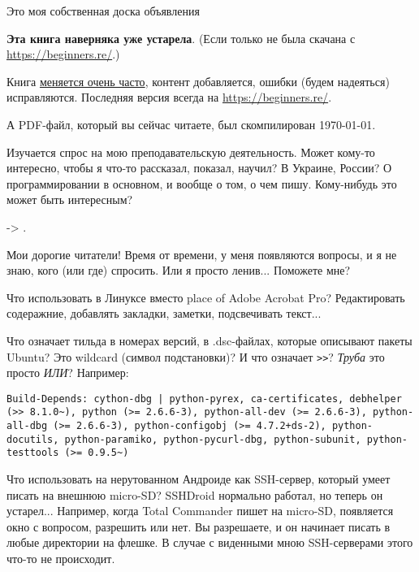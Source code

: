 
\begin{center}
\LARGE{} Это моя собственная доска объявления \normalsize{}
\end{center}

\textbf{Эта книга наверняка уже устарела}.
(Если только не была скачана с \url{https://beginners.re/}.)

Книга \href{https://github.com/DennisYurichev/RE-for-beginners/commits/master}{меняется очень часто},
контент добавляется, ошибки (будем надеяться) исправляются.
Последняя версия всегда на \url{https://beginners.re/}.

А PDF-файл, который вы сейчас читаете, был скомпилирован \today{}.

\myhrule{}

Изучается спрос на мою преподавательскую деятельность.
Может кому-то интересно, чтобы я что-то рассказал, показал, научил?
В Украине, России?
О программировании в основном, и вообще о том, о чем пишу.
Кому-нибудь это может быть интересным?

-> \EMAIL{}.

\myhrule{}

Мои дорогие читатели! Время от времени, у меня появляются вопросы, и я не знаю, кого (или где) спросить.
Или я просто ленив...
Поможете мне?

\myhrule{}

Что использовать в Линуксе вместо place of Adobe Acrobat Pro?
Редактировать содеражние, добавлять закладки, заметки, подсвечивать текст...

\myhrule{}

Что означает тильда в номерах версий, в .dsc-файлах, которые описывают пакеты Ubuntu?
Это wildcard (символ подстановки)?
И что означает \verb|>>|?
\emph{Труба} это просто \emph{ИЛИ}?
Например:

\begin{lstlisting}
Build-Depends: cython-dbg | python-pyrex, ca-certificates, debhelper (>> 8.1.0~), python (>= 2.6.6-3), python-all-dev (>= 2.6.6-3), python-all-dbg (>= 2.6.6-3), python-configobj (>= 4.7.2+ds-2), python-docutils, python-paramiko, python-pycurl-dbg, python-subunit, python-testtools (>= 0.9.5~)
\end{lstlisting}

\myhrule{}

Что использовать на нерутованном Андроиде как SSH-сервер, который умеет писать на внешнюю micro-SD?
SSHDroid нормально работал, но теперь он устарел...
Например, когда Total Commander пишет на micro-SD, появляется окно с вопросом, разрешить или нет.
Вы разрешаете, и он начинает писать в любые директории на флешке.
В случае с виденными мною SSH-серверами этого что-то не происходит.

